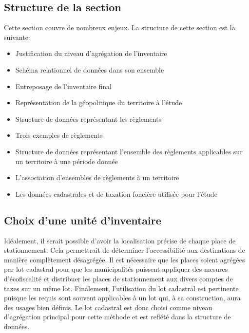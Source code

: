     \subsection{Structure de la section}
    Cette section couvre de nombreux enjeux. La structure de cette section est la suivante: \begin{itemize}
        \item Justification du niveau d'agrégation de l'inventaire
        \item Schéma relationnel de données dans son ensemble
        \item Entreposage de l'inventaire final
        \item Représentation de la géopolitique du territoire à l'étude
        \item Structure de données représentant les règlements
        \item Trois exemples de règlements
        \item Structure de données représentant l'ensemble des règlements applicables sur un territoire à une période donnée
        \item L'association d'ensembles de règlements à un territoire
        \item Les données cadastrales et de taxation foncière utilisée pour l'étude
    \end{itemize}
    \subsection{Choix d'une unité d'inventaire}
    Idéalement, il serait possible d'avoir la localisation précise de chaque place de stationnement. Cela permettrait de déterminer l'accessibilité aux destinations de manière complètement désagrégée. Il est nécessaire que les places soient agrégées par lot cadastral pour que les municipalités puissent appliquer des mesures d'écofiscalité et distribuer les places de stationnement aux divers comptes de taxes sur un même lot. Finalement, l'utilisation du lot cadastral est pertinente puisque les requis sont souvent applicables à un lot qui, à sa construction, aura des usages bien définis. Le lot cadastral est donc choisi comme niveau d'agrégation principal pour cette méthode et est reflété dans la structure de données.

